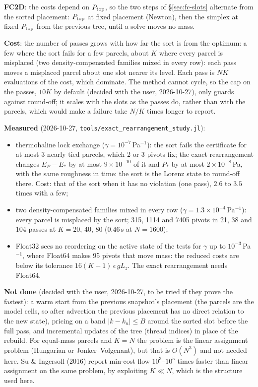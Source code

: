 \documentclass[11pt,a4paper]{article}
\newcommand{\code}[1]{\texttt{#1}}
\newcommand{\Ptop}{P_{\rm top}}
\begin{document}
\textbf{FC2D}: the costs depend on $\Ptop$, so the two steps of \S\ref{sec:fc-slots} alternate from the sorted placement: $\Ptop$
at fixed placement (Newton), then the simplex at fixed $\Ptop$ from the previous tree, until a solve moves no mass.

\textbf{Cost}: the number of passes grows with how far the sort is from the optimum: a few where the sort fails for a few
parcels, about $K$ where every parcel is misplaced (two density-compensated families mixed in every row): each pass moves a
misplaced parcel about one slot nearer its level. Each pass is $NK$ evaluations of the cost, which dominate. The method cannot
cycle, so the cap on the passes, $10K$ by default (decided with the user, 2026-10-27), only guards against round-off; it
scales with the slots as the passes do, rather than with the parcels, which would make a failure take $N/K$ times longer to
report.

\textbf{Measured} (2026-10-27, \code{tools/exact\_rearrangement\_study.jl}):
\begin{itemize}
  \item thermohaline lock exchange ($\gamma=10^{-7}$\,Pa$^{-1}$): the sort fails the certificate for at most 3 nearly tied
        parcels, which 2 or 3 pivots fix; the exact rearrangement changes $E_P-E_*$ by at most $9\times10^{-10}$ of it and $P_*$
        by at most $2\times10^{-8}$\,Pa, with the same roughness in time: the sort is the Lorenz state to round-off there.
        Cost: that of the sort when it has no violation (one pass), $2.6$ to $3.5$ times with a few;
  \item two density-compensated families mixed in every row ($\gamma=1.3\times10^{-4}$\,Pa$^{-1}$): every parcel is
        misplaced by the sort; 315, 1114 and 7405 pivots in 21, 38 and 104 passes at $K=20$, 40, 80 ($0.46$\,s at $N=1600$);
  \item Float32 sees no reordering on the active state of the tests for $\gamma$ up to $10^{-3}$\,Pa$^{-1}$, where Float64
        makes 95 pivots that move mass: the reduced costs are below its tolerance $16(K+1)\,\epsilon\,gL_z$. The exact
        rearrangement needs Float64.
\end{itemize}

\textbf{Not done} (decided with the user, 2026-10-27, to be tried if they prove the fastest): a warm start from the previous
snapshot's placement (the parcels are the model cells, so after advection the previous placement has no direct relation to
the new state), pricing on a band $|k-k_n|\le B$ around the sorted slot before the full pass, and incremental updates of the
tree (thread indices) in place of the rebuild. For equal-mass parcels and $K=N$ the problem is the linear assignment problem
(Hungarian or Jonker--Volgenant), but that is $O(N^3)$ and not needed here. Su \& Ingersoll (2016) report min-cost flow
$10^3$--$10^5$ times faster than linear assignment on the same problem, by exploiting $K\ll N$, which is the structure used
here.
\end{document}
